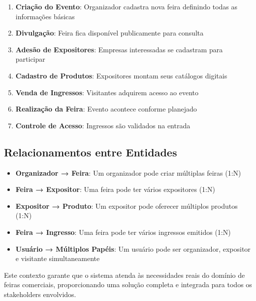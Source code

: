 \documentclass[12pt,a4paper]{article}
\begin{document}
\begin{enumerate}
    \item \textbf{Criação do Evento}: Organizador cadastra nova feira definindo todas as informações básicas
    \item \textbf{Divulgação}: Feira fica disponível publicamente para consulta
    \item \textbf{Adesão de Expositores}: Empresas interessadas se cadastram para participar
    \item \textbf{Cadastro de Produtos}: Expositores montam seus catálogos digitais
    \item \textbf{Venda de Ingressos}: Visitantes adquirem acesso ao evento
    \item \textbf{Realização da Feira}: Evento acontece conforme planejado
    \item \textbf{Controle de Acesso}: Ingressos são validados na entrada
\end{enumerate}

\subsection{Relacionamentos entre Entidades}

\begin{itemize}
    \item \textbf{Organizador → Feira}: Um organizador pode criar múltiplas feiras (1:N)
    \item \textbf{Feira → Expositor}: Uma feira pode ter vários expositores (1:N)
    \item \textbf{Expositor → Produto}: Um expositor pode oferecer múltiplos produtos (1:N)
    \item \textbf{Feira → Ingresso}: Uma feira pode ter vários ingressos emitidos (1:N)
    \item \textbf{Usuário → Múltiplos Papéis}: Um usuário pode ser organizador, expositor e visitante simultaneamente
\end{itemize}

Este contexto garante que o sistema atenda às necessidades reais do domínio de feiras comerciais, proporcionando uma solução completa e integrada para todos os stakeholders envolvidos.
\end{document}
